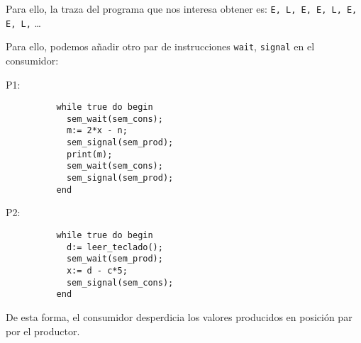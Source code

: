 \begin{ejercicio}
\begin{enumerate}
            Para ello, la traza del programa que nos interesa obtener es: \newline \verb|E, L, E, E, L, E, E, L,| \ldots

            Para ello, podemos añadir otro par de instrucciones \verb|wait|, \verb|signal| en el consumidor:
    \begin{multicols}{2}
        P1:
        \begin{verbatim}
          while true do begin
            sem_wait(sem_cons);  
            m:= 2*x - n;
            sem_signal(sem_prod);  
            print(m);
            sem_wait(sem_cons);  
            sem_signal(sem_prod);  
          end
        \end{verbatim}
        
        P2:
        \begin{verbatim}
          while true do begin
            d:= leer_teclado();
            sem_wait(sem_prod);  
            x:= d - c*5;
            sem_signal(sem_cons);  
          end
        \end{verbatim}
    \end{multicols}
    De esta forma, el consumidor desperdicia los valores producidos en posición par por el productor.
    \end{enumerate}
\end{ejercicio}

